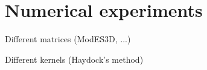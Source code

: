 \chapter{Numerical experiments}
\label{chp:5-experiments}

Different matrices (ModES3D, ...)

Different kernels (Haydock's method)
